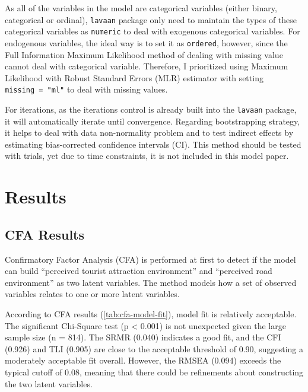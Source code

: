 \documentclass[
11pt, %
oneside, %
english, %
singlespacing, %
]{macthesis} %
\begin{document}
As all of the variables in the model are categorical variables (either binary, categorical or ordinal), \texttt{lavaan} package only need to maintain the types of these categorical variables as \texttt{numeric} to deal with exogenous categorical variables. For endogenous variables, the ideal way is to set it as \texttt{ordered}, however, since the Full Information Maximum Likelihood method of dealing with missing value cannot deal with categorical variable. Therefore, I prioritized using Maximum Likelihood with Robust Standard Errors (MLR) estimator with setting \texttt{missing\ =\ "ml"} to deal with missing values.

For iterations, as the iterations control is already built into the \texttt{lavaan} package, it will automatically iterate until convergence. Regarding bootstrapping strategy, it helps to deal with data non-normality problem and to test indirect effects by estimating bias-corrected confidence intervals (CI). This method should be tested with trials, yet due to time constraints, it is not included in this model paper.

\chapter{Results}\label{rmd-basics}

\section{CFA Results}\label{cfa-results}

Confirmatory Factor Analysis (CFA) is performed at first to detect if the model can build ``perceived tourist attraction environment'' and ``perceived road environment'' as two latent variables. The method models how a set of observed variables relates to one or more latent variables.

According to CFA results (\ref{tab:cfa-model-fit}), model fit is relatively acceptable. The significant Chi-Square test (p \textless{} 0.001) is not unexpected given the large sample size (n = 814). The SRMR (0.040) indicates a good fit, and the CFI (0.926) and TLI (0.905) are close to the acceptable threshold of 0.90, suggesting a moderately acceptable fit overall. However, the RMSEA (0.094) exceeds the typical cutoff of 0.08, meaning that there could be refinements about constructing the two latent variables.
\end{document}
